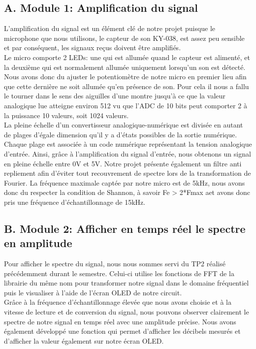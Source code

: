 \documentclass[a4paper,11pt]{book}
\begin{document}
\subsection*{A. Module 1: Amplification du signal }
L'amplification du signal est un élément clé de notre projet puisque le microphone que nous utilisons, le capteur de son KY-038, est assez peu sensible et par conséquent, les signaux reçus doivent être amplifiés.\\ 
Le micro comporte 2 LEDs: une qui est allumée quand le capteur est alimenté, et la deuxième qui est normalement allumée uniquement lorsqu'un son est détecté. 
Nous avons donc du ajuster le potentiomètre de notre micro en premier lieu afin que cette dernière ne soit allumée qu'en présence de son. Pour cela il nous a fallu le tourner dans le sens des aiguilles d'une montre jusqu'à ce que la valeur analogique lue atteigne environ 512 vu que l'ADC de 10 bits peut comporter 2 à la puissance 10 valeurs, soit 1024 valeurs. \\  
La pleine échelle d'un convertisseur analogique-numérique est divisée en autant de plages d’égale dimension qu’il y a d’états possibles de la sortie numérique. Chaque plage est associée à un code numérique représentant la tension analogique d’entrée. Ainsi, grâce à l'amplification du signal d'entrée, nous obtenons un signal en pleine échelle entre 0V et 5V. Notre projet présente également un filtre anti repliement afin d'éviter tout recouvrement de spectre lors de la transformation de Fourier. La fréquence maximale captée par notre micro est de 5kHz, nous avons donc du respecter la condition de Shannon, à savoir Fe > 2*Fmax aet avons donc pris une fréquence d'échantillonnage de 15kHz.

\subsection*{B. Module 2: Afficher en temps réel le spectre en amplitude}
Pour afficher le spectre du signal, nous nous sommes servi du TP2 réalisé précédemment durant le semestre. Celui-ci utilise les fonctions de FFT de la librairie du même nom pour transformer notre signal dans le domaine fréquentiel puis le visualiser à l'aide de l'écran OLED de notre circuit. \\ 
Grâce à la fréquence d'échantillonnage élevée que nous avons choisie et à la vitesse de lecture et de conversion du signal, nous pouvons observer clairement le spectre de notre signal en temps réel avec une amplitude précise. Nous avons également développé une fonction qui permet d'afficher les décibels mesurés et d'afficher la valeur également sur notre écran OLED.
\end{document}
